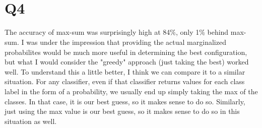 \documentclass{article}
\begin{document}
~\\
~\\
~\\
~\\
~\\
~\\
~\\
~\\
~\\
~\\
~\\
~\\
~\\
~\\
~\\
~\\
~\\
~\\
~\\
~\\
~\\
~\\
~\\
~\\

\section{Q4}

The accuracy of max-sum was surprisingly high at 84\%, only 1\% behind max-sum. 
I was under the impression that providing the actual marginalized probabilites 
would be much more useful in determining the best configuration, but what I 
would consider the "greedy" approach (just taking the best) worked well. To 
understand this a little better, I think we can compare it to a similar 
situation. For any classifier, even if that classifier returns values for each 
class label in the form of a probability, we usually end up simply taking the 
max of the classes. In that case, it is our best guess, so it makes sense to do 
so. Similarly, just using the max value is our best guess, so it makes sense to 
do so in this situation as well.
\end{document}

